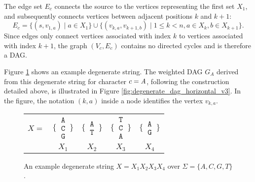 The edge set $E_c$ connects the source to the vertices representing the first set $X_1$, and subsequently connects vertices between adjacent positions $k$ and $k+1$:
\[ E_c = \{ (s, v_{1,a}) \mid a \in X_1 \} \cup \{ (v_{k,a}, v_{k+1,b}) \mid 1 \le k < n, a \in X_k, b \in X_{k+1} \}. \]
Since edges only connect vertices associated with index $k$ to vertices associated with index $k+1$, the graph $(V_c, E_c)$ contains no directed cycles and is therefore a DAG.

Figure \ref{fig:degenerate_example_tabular_v3} shows an example degenerate string. The weighted DAG $G_A$ derived from this degenerate string for character $c = \emph{A}$, following the construction detailed above, is illustrated in Figure \ref{fig:degenerate_dag_horizontal_v3}. In the figure, the notation $(k,a)$ inside a node identifies the vertex $v_{k,a}$.

\begin{figure}[htbp]
    \centering
    \begin{tabular}{c@{\hskip 0.5em}c@{\hskip 0.5em}c@{\hskip 0.5em}c@{\hskip 0.5em}c}
        $X = $                                                                           & $\Bigg\{\,\begin{matrix}\texttt{A}\\\texttt{C}\\\texttt{G}\end{matrix}\,\Bigg\}$ &
        $\Bigg\{\,\begin{matrix}\texttt{A}\\\texttt{T}\end{matrix}\,\Bigg\}$             &
        $\Bigg\{\,\begin{matrix}\texttt{T}\\\texttt{C}\\\texttt{A}\end{matrix}\,\Bigg\}$ &
        $\Bigg\{\,\begin{matrix}\texttt{A}\\\texttt{G}\end{matrix}\,\Bigg\}$                                                                                                                        \\
                                                                                         & $X_1$                                                                            & $X_2$ & $X_3$ & $X_4$
    \end{tabular}
    \caption{An example degenerate string $X = X_1 X_2 X_3 X_4$ over $\Sigma = \{A, C, G, T\}$.}
    \label{fig:degenerate_example_tabular_v3}
\end{figure}

